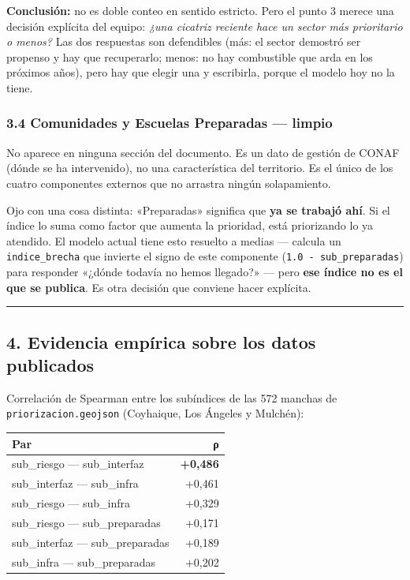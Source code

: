 \documentclass[
  spanish,
  10pt,
]{article}
\begin{document}
\textbf{Conclusión:} no es doble conteo en sentido estricto. Pero el
punto 3 merece una decisión explícita del equipo: \emph{¿una cicatriz
reciente hace un sector más prioritario o menos?} Las dos respuestas son
defendibles (más: el sector demostró ser propenso y hay que recuperarlo;
menos: no hay combustible que arda en los próximos años), pero hay que
elegir una y escribirla, porque el modelo hoy no la tiene.

\subsubsection{3.4 Comunidades y Escuelas Preparadas ---
limpio}\label{comunidades-y-escuelas-preparadas-limpio}

No aparece en ninguna sección del documento. Es un dato de gestión de
CONAF (dónde se ha intervenido), no una característica del territorio.
Es el único de los cuatro componentes externos que no arrastra ningún
solapamiento.

Ojo con una cosa distinta: «Preparadas» significa que \textbf{ya se
trabajó ahí}. Si el índice lo suma como factor que aumenta la prioridad,
está priorizando lo ya atendido. El modelo actual tiene esto resuelto a
medias --- calcula un \texttt{indice\_brecha} que invierte el signo de
este componente (\texttt{1.0\ -\ sub\_preparadas}) para responder
«¿dónde todavía no hemos llegado?» --- pero \textbf{ese índice no es el
que se publica}. Es otra decisión que conviene hacer explícita.

\begin{center}\rule{0.5\linewidth}{0.5pt}\end{center}

\subsection{4. Evidencia empírica sobre los datos
publicados}\label{evidencia-empuxedrica-sobre-los-datos-publicados}

Correlación de Spearman entre los subíndices de las 572 manchas de
\texttt{priorizacion.geojson} (Coyhaique, Los Ángeles y Mulchén):

\begin{longtable}[]{@{}lr@{}}
\toprule\noalign{}
Par & ρ \\
\midrule\noalign{}
\endhead
\bottomrule\noalign{}
\endlastfoot
sub\_riesgo --- sub\_interfaz & \textbf{+0,486} \\
sub\_interfaz --- sub\_infra & +0,461 \\
sub\_riesgo --- sub\_infra & +0,329 \\
sub\_riesgo --- sub\_preparadas & +0,171 \\
sub\_interfaz --- sub\_preparadas & +0,189 \\
sub\_infra --- sub\_preparadas & +0,202 \\
\end{longtable}
\end{document}
